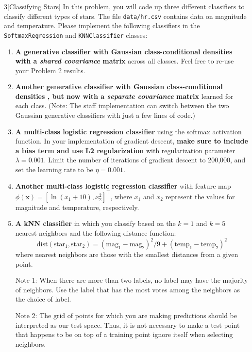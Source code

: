 \documentclass[expanded]{lkx_pset}
\begin{document}
\begin{problem}{3}[Classifying Stars]
In this problem, you will code up three different classifiers to classify different types of stars. The file \verb|data/hr.csv| contains data on magnitude and temperature. Please implement the following classifiers in the \verb|SoftmaxRegression| and \verb|KNNClassifier| classes:

\begin{enumerate}[label=\alph*)]

	\item \textbf{A generative classifier with Gaussian class-conditional
		      densities with a \textit{shared covariance} matrix} across all classes.
	      Feel free to re-use your Problem 2 results.

	\item \textbf{Another generative classifier with Gaussian class-conditional densities , but now
		      with a \textit{separate covariance} matrix} learned for each class. (Note:
	      The staff implementation can switch between the two Gaussian generative classifiers with just a
	      few lines of code.)

	\item \textbf{A multi-class logistic regression classifier} using the softmax activation function. In your implementation of gradient descent, \textbf{make sure to include a bias term and use L2 regularization} with regularization parameter $\lambda = 0.001$. Limit the number of iterations of gradient descent to 200,000, and set the learning rate to be $\eta = 0.001$.

	\item \textbf{Another multi-class logistic regression classifier} with feature map $\phi(\bm{x}) = [\ln (x_1 + 10), x_2^2]^\intercal$, where $x_1$ and $x_2$ represent the values for magnitude and temperature, respectively.

	\item \textbf{A kNN classifier} in which you classify based on the $k = 1$ and $k = 5$ nearest neighbors and the following distance function: $$\textrm{dist}(\textrm{star}_1, \textrm{star}_2) = (\textrm{mag}_1 - \textrm{mag}_2)^2/9 + (\textrm{temp}_1 - \textrm{temp}_2)^2$$
	      where nearest neighbors are those with the smallest distances from a given point.

	      Note 1: When there are more than two labels, no label may have the
	      majority of neighbors.  Use the label that has the most votes among
	      the neighbors as the choice of label.

	      Note 2: The grid of points for which you are making predictions
	      should be interpreted as our test space.  Thus, it is not necessary
	      to make a test point that happens to be on top of a training point
	      ignore itself when selecting neighbors.
\end{enumerate}
\end{problem}
\end{document}
